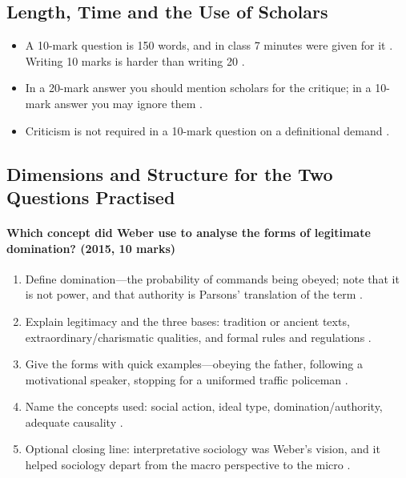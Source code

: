 \subsection{Length, Time and the Use of Scholars}
\begin{itemize}
    \item A 10-mark question is 150 words, and in class 7 minutes were given for it . Writing 10 marks is harder than writing 20 .
    \item In a 20-mark answer you should mention scholars for the critique; in a 10-mark answer you may ignore them .
    \item Criticism is not required in a 10-mark question on a definitional demand .
\end{itemize}

\subsection{Dimensions and Structure for the Two Questions Practised}

\paragraph{Which concept did Weber use to analyse the forms of legitimate domination? (2015, 10 marks)}
\begin{enumerate}
    \item Define domination---the probability of commands being obeyed; note that it is not power, and that authority is Parsons' translation of the term .
    \item Explain legitimacy and the three bases: tradition or ancient texts, extraordinary/charismatic qualities, and formal rules and regulations .
    \item Give the forms with quick examples---obeying the father, following a motivational speaker, stopping for a uniformed traffic policeman .
    \item Name the concepts used: social action, ideal type, domination/authority, adequate causality .
    \item Optional closing line: interpretative sociology was Weber's vision, and it helped sociology depart from the macro perspective to the micro .
\end{enumerate}

